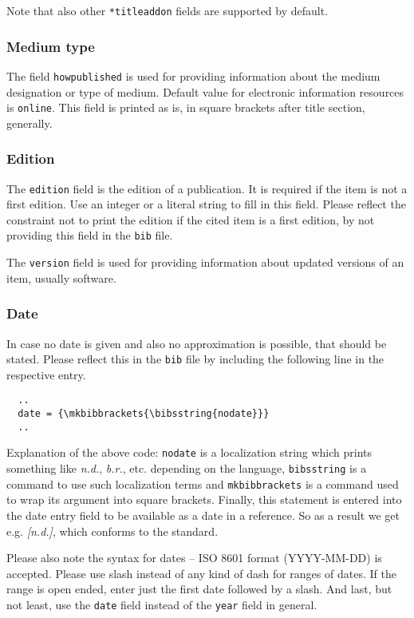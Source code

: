 \documentclass[a4paper,10pt]{ltxdockit}
\def\t|#1|{\texttt{#1}}
\begin{document}
Note that also other \t|*titleaddon| fields are supported by default.

\subsubsection{Medium type}

The field \t|howpublished| is used for providing information about
the medium designation or type of medium. Default value for electronic
information resources is \t|online|. This field is printed as is,
in square brackets after title section, generally.

\subsubsection{Edition}

The \t|edition| field is the edition of a publication. It is required
if the item is not a first edition. Use an integer or a literal string
to fill in this field. Please reflect the constraint not to print
the edition if the cited item is a first edition, by not providing
this field in the \t|bib| file.

The \t|version| field is used for providing information about
updated versions of an item, usually software.

\subsubsection{Date}

In case no date is given and also no approximation is possible, that
should be stated. Please reflect this in the \t|bib| file by including
the following line in the respective entry.

\begin{verbatim}
  ..
  date = {\mkbibbrackets{\bibsstring{nodate}}}
  ..
\end{verbatim}

Explanation of the above code:
\t|nodate| is a localization string which prints something like
\textit{n.d.}, \textit{b.r.}, etc. depending on the language,
\t|bibsstring| is a command to use such localization terms and
\t|mkbibbrackets| is a command used to wrap its argument into
square brackets. Finally, this statement is entered into
the date entry field to be available as a date in a reference.
So as a result we get e.g. \textit{[n.d.]}, which conforms to
the standard.

Please also note the syntax for dates -- ISO 8601 format
(YYYY-MM-DD) is accepted. Please use slash instead of
any kind of dash for ranges of dates. If the range is
open ended, enter just the first date followed by a slash.
And last, but not least, use the \t|date| field instead of
the \t|year| field in general.
\end{document}
